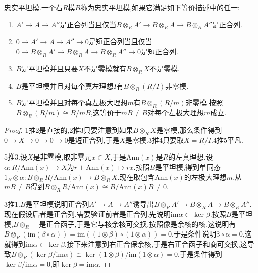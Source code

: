 忠实平坦模.一个右$R$模$B$称为忠实平坦模,如果它满足如下等价描述中的任一:
\begin{enumerate}
	\item $A'\to A\to A''$是正合列当且仅当$B\otimes_RA'\to B\otimes_RA\to B\otimes_RA''$是正合列.
	\item $0\to A'\to A\to A''\to0$是短正合列当且仅当$0\to B\otimes_RA'\to B\otimes_RA\to B\otimes_RA''\to0$是短正合列.
	\item $B$是平坦模并且只要$X$不是零模就有$B\otimes_RX$不是零模.
	\item $B$是平坦模并且对每个真左理想$I$有$B\otimes_R(R/I)$非零模.
	\item $B$是平坦模并且对每个真左极大理想$m$有$B\otimes_R(R/m)$非零模.按照$B\otimes_R(R/m)\cong B/mB$,这等价于$mB\not=B$对每个左极大理想$m$成立.
\end{enumerate}
\begin{proof}
	
	1推2是直接的,2推3只要注意到如果$B\otimes_RX$是零模,那么条件得到$0\to X\to0\to0\to0$是短正合列,于是$X$是零模.3推4只要取$X=R/I$.4推5平凡.
	
	5推3.设$X$是非零模,取非零元$x\in X$,于是$\mathrm{Ann}(x)$是$R$的左真理想.设$\alpha:R/\mathrm{Ann}(x)\to X$为$r+\mathrm{Ann}(x)\mapsto rx$.按照$B$是平坦模,得到单同态$1_B\otimes\alpha:B\otimes_RR/\mathrm{Ann}(x)\to B\otimes_RX$.现在取包含$\mathrm{Ann}(x)$的左极大理想$m$,从$mB\not=B$得到$B\otimes_RR/\mathrm{Ann}(x)\cong B/\mathrm{Ann}(x)B\not=0$.
	
	3推1.$B$是平坦模说明正合列$A'\to A\to A''$诱导出$B\otimes_RA'\to B\otimes_RA\to B\otimes_RA''$.现在假设后者是正合列,需要验证前者是正合列.先说明$\mathrm{im}\alpha\subset\ker\beta$.按照$B$是平坦模,$B\otimes_R-$是正合函子,于是它与核余核可交换,按照像是余核的核,这说明有$B\otimes_R(\mathrm{im}(\beta\circ\alpha))=\mathrm{im}((1\otimes\beta)\circ(1\otimes\alpha))=0$,于是条件说明$\mathrm{\beta\circ\alpha}=0$,这就得到$\mathrm{im}\alpha\subset\ker\beta$.接下来注意到右正合保余核,于是右正合函子和商可交换,这导致$B\otimes_R(\ker\beta/\mathrm{im}\alpha)\cong\ker(1\otimes\beta)/\mathrm{im}(1\otimes\alpha)=0$.于是条件得到$\ker\beta/\mathrm{im}\alpha=0$,即$\ker\beta=\mathrm{im}\alpha$.
\end{proof}

